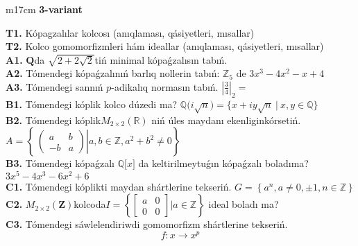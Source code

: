 \documentclass{article}
\begin{document}
\begin{tabular}{m{17cm}}
\textbf{3-variant}
\newline

\textbf{T1.} Kópagzalılar kolcosı (anıqlaması, qásiyetleri, mısallar) \\
\textbf{T2.} Kolco gomomorfizmleri hám ideallar (anıqlaması, qásiyetleri, mısallar) \\
\textbf{A1.} \(\mathbf{Q}\)da \(\sqrt{2 + 2\sqrt{2}}\)tiń minimal kópaǵzalısın tabıń. \\
\textbf{A2.} Tómendegi kópaǵzalınıń barlıq nollerin tabıń: \(\mathbb{Z}_{5}\) de \(3x^{3} - 4x^{2} - x + 4\) \\
\textbf{A3.} Tómendegi sannıń \(p\)-adikalıq normasın tabıń. \(|\frac{3}{4}|_{2} =\) \\
\textbf{B1.} Tómendegi kóplik kolco dúzedi ma? \(\mathbb{Q(}i\sqrt{n}) = \{ x + iy\sqrt{n}\ |\ x,y \in \mathbb{Q}\}\) \\
\textbf{B2.} Tómendegi kóplik\(M_{2 \times 2}\left( \mathbb{R} \right)\) niń úles maydanı ekenliginkórsetiń. \(A = \left\{ \left. \ \begin{pmatrix}
a & b \\
 - b & a
\end{pmatrix} \right|a,b\mathbb{\in Z},a^{2} + b^{2} \neq 0 \right\}\) \\
\textbf{B3.} Tómendegi kópaǵzalı \(\mathbb{Q\lbrack}x\rbrack\) da keltirilmeytuǵın kópaǵzalı boladıma? \(3x^{5} - 4x^{3} - 6x^{2} + 6\) \\
\textbf{C1.} Tómendegi kóplikti maydan shártlerine tekseriń. \(G = \left\{ a^{n},a \neq 0, \pm 1,n \in \mathbb{Z} \right\}\) \\
\textbf{C2.} \(M_{2 \times 2}\left( \mathbf{Z} \right)\)kolcoda\(I = \left\{ \begin{bmatrix}
a & 0 \\
0 & 0
\end{bmatrix}|a\mathbb{\in Z} \right\}\) ideal boladı ma? \\
\textbf{C3.} Tómendegi sáwlelendiriwdi gomomorfizm shártlerine tekseriń.
\[f:x \rightarrow x^{p}\] \\

\end{tabular}
\vspace{1cm}
\end{document}
